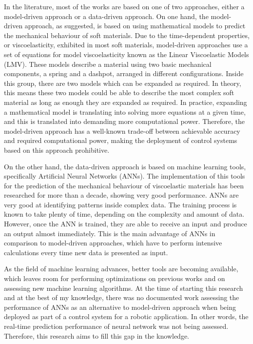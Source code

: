 In the literature, most of the works are based on one of two approaches, either a model-driven approach or a data-driven approach. On one hand, the model-driven approach, as suggested, is based on using mathematical models to predict the mechanical behaviour of soft materials. Due to the time-dependent properties, or viscoelasticity, exhibited in most soft materials, model-driven approaches use a set of equations for model viscoelasticity known as the Linear Viscoelastic Models (LMV). These models describe a material using two basic mechanical components, a spring and a dashpot, arranged in different configurations. Inside this group, there are two models which can be expanded as required. In theory, this means these two models could be able to describe the most complex soft material as long as enough they are expanded as required. In practice, expanding a mathematical model is translating into solving more equations at a given time, and this is translated into demanding more computational power. Therefore, the model-driven approach has a well-known trade-off between achievable accuracy and required computational power, making the deployment of control systems based on this approach prohibitive. 

On the other hand, the data-driven approach is based on machine learning tools, specifically Artificial Neural Networks (ANNs). The implementation of this tools for the prediction of the mechanical behaviour of viscoelastic materials has been researched for more than a decade, showing very good performance. ANNs are very good at identifying patterns inside complex data. The training process is known to take plenty of time, depending on the complexity and amount of data. However, once the ANN is trained, they are able to receive an input and produce an output almost immediately. This is the main advantage of ANNs in comparison to model-driven approaches, which have to perform intensive calculations every time new data is presented as input.

As the field of machine learning advances, better tools are becoming available, which leaves room for performing optimizations on previous works and on assessing new machine learning algorithms. At the time of starting this research and at the best of my knowledge, there was no documented work assessing the performance of ANNs as an alternative to model-driven approach when being deployed as part of a control system for a robotic application. In other words, the real-time prediction performance of neural network was not being assessed. Therefore, this research aims to fill this gap in the knowledge.

